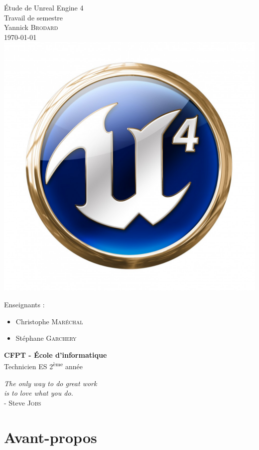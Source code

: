 \documentclass[11pt, a4paper, oneside]{article}
\begin{document}
\begin{center}
{\Huge{Étude de Unreal Engine 4}} \\[0.5cm]
{\LARGE{Travail de semestre}}\\[0.5cm]
{\Large{Yannick \textsc{Brodard}}}\\[0.3cm]
\today\\
\includegraphics[scale=0.4]{UE4_logo}
\end{center}
Enseignants :
\begin{itemize}
\item Christophe \textsc{Maréchal}
\item Stéphane \textsc{Garchery}\\[3cm]
\end{itemize}
\textbf{CFPT - École d'informatique}\\
Technicien ES 2\textsuperscript{ème} année
\thispagestyle{empty}
\newpage
\vspace*{\fill}
\begin{flushright}
\textit{The only way to do great work\\is to love what you do.}\\[0.3cm]
- Steve \textsc{Jobs}
\end{flushright}
\vspace*{\fill}
\thispagestyle{empty}
\newpage
\part{Avant-propos}
\end{document}
